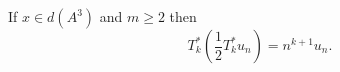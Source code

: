 If $x \in d(A^3)$ and $m \geq 2$ then
$$T_k^* \left( \frac{1}{2} T_k^* u_n \right) = n^{k+1} u_n.$$
